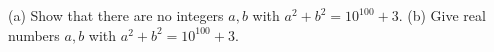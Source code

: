 (a) Show that there are no integers $a,b$ with $a^2+b^2=10^{100}+3$. (b) Give real numbers $a,b$ with $a^2+b^2=10^{100}+3$.
